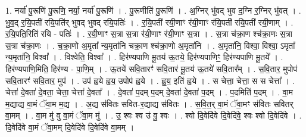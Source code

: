 \documentclass[17pt]{extarticle}
\begin{document}
1. नर्या॑ पु॒रूणि॑ पु॒रूणि॒ नर्या॒ नर्या॑ पु॒रूणि॑ । . पु॒रूणीति॑ पु॒रूणि॑ । . अ॒ग्निर् भु॑वद् भुव द॒ग्नि र॒ग्निर् भु॑वत् । . भु॒व॒द् र॒यि॒पती॑ रयि॒पति॑र् भुवद् भुवद् रयि॒पतिः॑ । . र॒यि॒पती॑ रयी॒णाꣳ र॑यी॒णाꣳ र॑यि॒पती॑ रयि॒पती॑ रयी॒णाम् । . र॒यि॒पति॒रिति॑ रयि - पतिः॑ । . र॒यी॒णाꣳ स॒त्रा स॒त्रा र॑यी॒णाꣳ र॑यी॒णाꣳ स॒त्रा । . स॒त्रा च॑क्रा॒ण श्च॑क्रा॒णः स॒त्रा स॒त्रा च॑क्रा॒णः । . च॒क्रा॒णो अ॒मृता᳚ न्य॒मृता॑नि चक्रा॒ण श्च॑क्रा॒णो अ॒मृता॑नि । . अ॒मृता॑नि॒ विश्वा॒ विश्वा॒ ऽमृता᳚ न्य॒मृता॑नि॒ विश्वा᳚ । . विश्वेति॒ विश्वा᳚ । . हिर॑ण्यपाणि मू॒तय॑ ऊ॒तये॒ हिर॑ण्यपाणिꣳ॒॒ हिर॑ण्यपाणि मू॒तये᳚ । . हिर॑ण्यपाणि॒मिति॒ हिर॑ण्य - पा॒णि॒म् । . ऊ॒तये॑ सवि॒तारꣳ॑ सवि॒तार॑ मू॒तय॑ ऊ॒तये॑ सवि॒तार᳚म् । . स॒वि॒तार॒ मुपोप॑ सवि॒तारꣳ॑ सवि॒तार॒ मुप॑ । . उप॑ ह्वये ह्वय॒ उपोप॑ ह्वये । . ह्व॒य॒ इति॑ ह्वये । . स चेत्ता॒ चेत्ता॒ स स चेत्ता᳚ । . चेत्ता॑ दे॒वता॑ दे॒वता॒ चेत्ता॒ चेत्ता॑ दे॒वता᳚ । . दे॒वता॑ प॒दम् प॒दम् दे॒वता॑ दे॒वता॑ प॒दम् । . प॒दमिति॑ प॒दम् । . वा॒म म॒द्याद्य वा॒मं ॅवा॒म म॒द्य । . अ॒द्य स॑वितः सवित-र॒द्याद्य स॑वितः । . स॒वि॒त॒र् वा॒मं ॅवा॒मꣳ स॑वितः सवितर् वा॒मम् । . वा॒म मु॑ वु वा॒मं ॅवा॒म मु॑ । . उ॒ श्वः श्व उ॑ वु॒ श्वः । . श्वो दि॒वेदि॑वे दि॒वेदि॑वे॒ श्वः श्वो दि॒वेदि॑वे । . दि॒वेदि॑वे वा॒मं ॅवा॒मम् दि॒वेदि॑वे दि॒वेदि॑वे वा॒मम् । \newline
\end{document}
